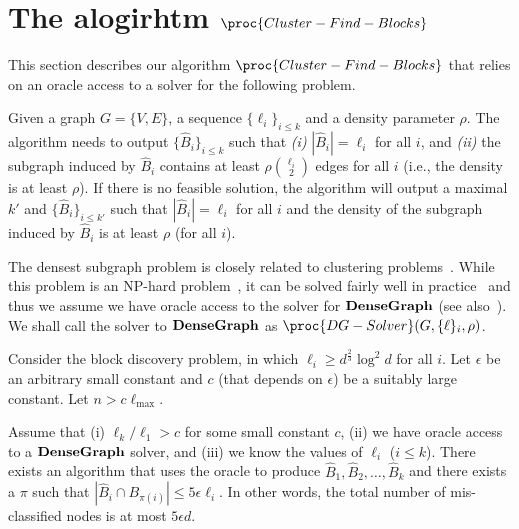 \section{The alogirhtm $\proc{Cluster-Find-Blocks}$}\label{asec:clustering}

This section describes our algorithm $\proc{Cluster-Find-Blocks}$ that relies on an oracle access to a solver for the following problem.


 Given a graph $G = \{V, E\}$, a sequence $\{\ell_i\}_{i \leq k}$ and a density parameter $\rho.$ The algorithm needs to output $\{\hat B_i\}_{i \leq k}$ such that \emph{(i)} $|\hat B_i| = \ell_i$ for all $i$, and \emph{(ii)} the subgraph induced by $\hat B_i$ contains at least $\rho \binom{\ell_i}{2}$ edges for all $i$ (i.e., the density is at least $\rho$). If there is no feasible solution, the algorithm will output a maximal $k'$ and $\{ \hat B_i \}_{i \leq k'}$ such that $|\hat B_i| = \ell_i$ for all $i$ and the density of the subgraph induced by $\hat B_i$ is at least $\rho$ (for all $i$). 


The densest  subgraph problem is closely related to clustering problems~\cite{gunnemann2010subspace,lee2010survey,schaeffer2007graph}. 
While this problem is an NP-hard problem~\cite{feige2001dense,bhaskara2010detecting}, it can be solved fairly well in practice~\cite{harenberg2014community,lee2010survey} and thus we assume we have oracle access to the solver for $\mathbf{DenseGraph}$ (see also~\cite{rohe2011spectral,wolfe2013nonparametric,olhede2014network}). We shall call the solver to $\mathbf{DenseGraph}$ as $\proc{DG-Solver}(G, \{\ell\}_i, \rho)$.  
 
\begin{lemma}\label{lem:clusterquality}
Consider the block discovery problem, in which $\ell_i \geq d^{\frac 2 3}\log^2 d$ for all $i$. 
Let $\epsilon$ be an arbitrary small constant and $c$ (that depends on $\epsilon$) be a suitably large constant. Let $n > c \ell_{\max}$. 

Assume that  (i) $\ell_k/\ell_{1} > c$ for some small constant $c$, (ii) we have oracle access to a $\mathbf{DenseGraph}$ solver, and (iii) we know the values of $\ell_i$ ($i \leq k$). There exists an algorithm that uses the oracle to produce $\hat B_1, \hat B_2, \dots, \hat B_k$ and there exists a $\pi$ such that $|\hat B_{i} \cap B_{\pi(i)}| \leq 5\epsilon \ell_i$. In other words, the total number of mis-classified nodes is at most $5\epsilon d$.
\end{lemma}


